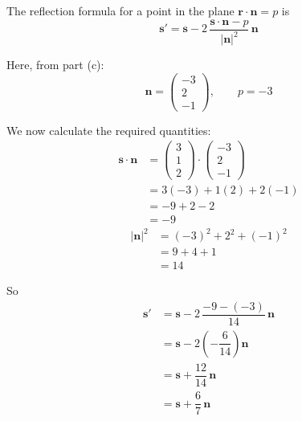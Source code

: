\documentclass[leqno]{article}
\begin{document}
\begin{enumerate}[
  label=\textbf{\arabic*.},
  leftmargin=*,
  topsep=0pt,
  partopsep=0pt,
  parsep=0pt
]
\begin{djsSolution}
\begin{enumerate}[label=\textbf{(\alph*)}]
The reflection formula for a point in the plane \(\mathbf r\cdot\mathbf n=p\) is
\[
\mathbf s'
=\mathbf s
-2\,\dfrac{\mathbf s\cdot\mathbf n-p}{|\mathbf n|^2}\,\mathbf n
\]

Here, from part (c):
\[
\mathbf n=\begin{pmatrix}-3\\2\\-1\end{pmatrix},\qquad p=-3
\]

We now calculate the required quantities:
\begin{align*}
\mathbf s\cdot\mathbf n
&=\begin{pmatrix}3\\1\\2\end{pmatrix}\cdot\begin{pmatrix}-3\\2\\-1\end{pmatrix} \\
&=3(-3)+1(2)+2(-1) \\
&=-9+2-2 \\
&=-9
\end{align*}
\begin{align*}
|\mathbf n|^2
&=(-3)^2+2^2+(-1)^2 \\
&=9+4+1 \\
&=14
\end{align*}

So
\begin{align*}
\mathbf s'
&=\mathbf s-2\,\dfrac{-9-(-3)}{14}\,\mathbf n \\
&=\mathbf s-2\left(-\dfrac{6}{14}\right)\mathbf n \\
&=\mathbf s+\dfrac{12}{14}\,\mathbf n \\
&=\mathbf s+\dfrac67\,\mathbf n
\end{align*}


\end{enumerate}
\end{djsSolution}
\end{enumerate}
\end{document}
